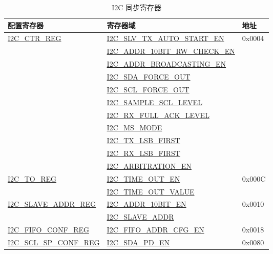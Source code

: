 \documentclass[main\_\_CN.tex]{subfiles}
\begin{document}
\newpage
\begin{longtable}{ | p{6cm} | p{7cm} | p{2cm} | }
\caption{I2C 同步寄存器}
\label{tab:i2c-sync-register}
\\\hline
\rowcolor{lightgray}
配置寄存器& 寄存器域 & 地址  \\ \hline
\hyperref[regdesc:I2CCTRREG]{I2C\_CTR\_REG} & {\hyperref[fielddesc:I2CSLVTXAUTOSTARTEN]{I2C\_SLV\_TX\_AUTO\_START\_EN}} & 0x0004  \\\cline{2-2}
& {\hyperref[fielddesc:I2CADDR10BITRWCHECKEN]{I2C\_ADDR\_10BIT\_RW\_CHECK\_EN}}& \\\cline{2-2}
& {\hyperref[fielddesc:I2CADDRBROADCASTINGEN]{I2C\_ADDR\_BROADCASTING\_EN}}& \\\cline{2-2}
& {\hyperref[fielddesc:I2CSDAFORCEOUT]{I2C\_SDA\_FORCE\_OUT}}& \\\cline{2-2}
& {\hyperref[fielddesc:I2CSCLFORCEOUT]{I2C\_SCL\_FORCE\_OUT}}& \\\cline{2-2}
& {\hyperref[fielddesc:I2CSAMPLESCLLEVEL]{I2C\_SAMPLE\_SCL\_LEVEL}}& \\\cline{2-2}
& {\hyperref[fielddesc:I2CRXFULLACKLEVEL]{I2C\_RX\_FULL\_ACK\_LEVEL}}& \\\cline{2-2}
& {\hyperref[fielddesc:I2CMSMODE]{I2C\_MS\_MODE}}& \\\cline{2-2}
& {\hyperref[fielddesc:I2CTXLSBFIRST]{I2C\_TX\_LSB\_FIRST}}& \\\cline{2-2}
& {\hyperref[fielddesc:I2CRXLSBFIRST]{I2C\_RX\_LSB\_FIRST}}& \\\cline{2-2}
& {\hyperref[fielddesc:I2CARBITRATIONEN]{I2C\_ARBITRATION\_EN}}& \\ \hline
\hyperref[regdesc:I2CTOREG]{I2C\_TO\_REG} & {\hyperref[fielddesc:I2CTIMEOUTEN]{I2C\_TIME\_OUT\_EN}} & 0x000C  \\\cline{2-2}
& {\hyperref[fielddesc:I2CTIMEOUTVALUE]{I2C\_TIME\_OUT\_VALUE}}& \\ \hline
\hyperref[regdesc:I2CSLAVEADDRREG]{I2C\_SLAVE\_ADDR\_REG} & {\hyperref[fielddesc:I2CADDR10BITEN]{I2C\_ADDR\_10BIT\_EN}} & 0x0010 \\\cline{2-2}
& {\hyperref[fielddesc:I2CSLAVEADDR]{I2C\_SLAVE\_ADDR}}& \\ \hline
\hyperref[regdesc:I2CFIFOCONFREG]{I2C\_FIFO\_CONF\_REG} & {\hyperref[fielddesc:I2CFIFOADDRCFGEN]{I2C\_FIFO\_ADDR\_CFG\_EN}} & 0x0018 \\ \hline
\hyperref[regdesc:I2CSCLSPCONFREG]{I2C\_SCL\_SP\_CONF\_REG} & {\hyperref[fielddesc:I2CSDAPDEN]{I2C\_SDA\_PD\_EN}} & 0x0080  \\\cline{2-2}

\end{longtable}
\end{document}
